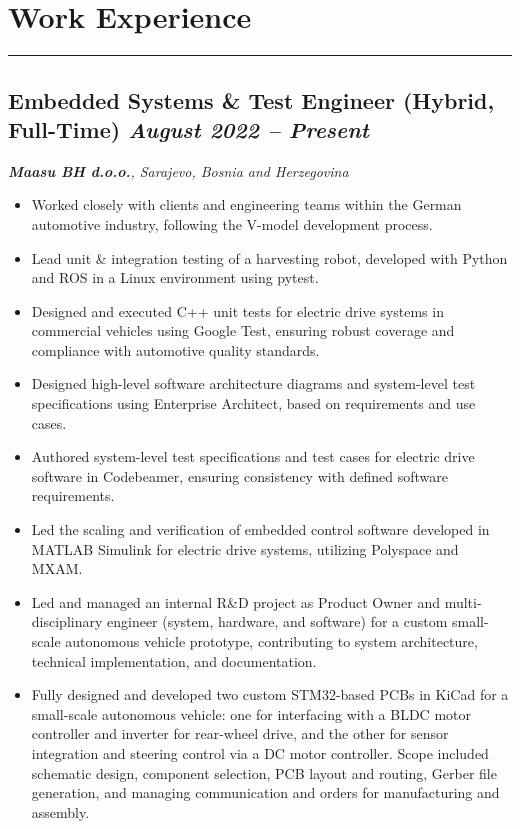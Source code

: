 \section*{Work Experience}
\vspace{-5pt} 
\noindent\rule{\textwidth}{0.4pt} %

\subsection*{\textbf{Embedded Systems \& Test Engineer (Hybrid, Full-Time)} \hfill \textit{August 2022 -- Present}}  
\noindent\textit{\textbf{Maasu BH d.o.o.}, Sarajevo, Bosnia and Herzegovina} 
\begin{itemize}[leftmargin=*,noitemsep,topsep=3pt]
    \item Worked closely with clients and engineering teams within the German automotive industry, following the V-model development process.
    \item Lead unit \& integration testing of a harvesting robot, developed with Python and ROS in a Linux environment using pytest.
    \item Designed and executed C++ unit tests for electric drive systems in commercial vehicles using Google Test, ensuring robust coverage and compliance with automotive quality standards.
    \item Designed high-level software architecture diagrams and system-level test specifications using Enterprise Architect, based on requirements and use cases.
    \item Authored system-level test specifications and test cases for electric drive software in Codebeamer, ensuring consistency with defined software requirements.
    \item Led the scaling and verification of embedded control software developed in MATLAB Simulink for electric drive systems, utilizing Polyspace and MXAM.
    \item Led and managed an internal R\&D project as Product Owner and multi-disciplinary engineer (system, hardware, and software) for a custom small-scale autonomous vehicle prototype, contributing to system architecture, technical implementation, and documentation.
    \item Fully designed and developed two custom STM32-based PCBs in KiCad for a small-scale autonomous vehicle: one for interfacing with a BLDC motor controller and inverter for rear-wheel drive, and the other for sensor integration and steering control via a DC motor controller. Scope included schematic design, component selection, PCB layout and routing, Gerber file generation, and managing communication and orders for manufacturing and assembly.

\end{itemize}
